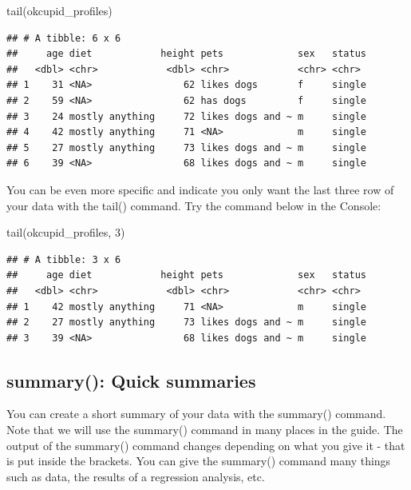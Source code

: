 \documentclass[
]{krantz}
\makeatletter
\newenvironment{Shaded}{\begin{snugshade}}{\end{snugshade}}
\newcommand{\DecValTok}[1]{\textcolor[rgb]{0.06,0.06,0.06}{#1}}
\newcommand{\FunctionTok}[1]{\textcolor[rgb]{0,0,0}{#1}}
\newcommand{\NormalTok}[1]{#1}
\newenvironment{kframe}{%
\medskip{}
\setlength{\fboxsep}{.8em}
 \def\at@end@of@kframe{}%
 \ifinner\ifhmode%
  \def\at@end@of@kframe{\end{minipage}}%
  \begin{minipage}{\columnwidth}%
 \fi\fi%
 \def\FrameCommand##1{\hskip\@totalleftmargin \hskip-\fboxsep
 \colorbox{shadecolor}{##1}\hskip-\fboxsep
     \hskip-\linewidth \hskip-\@totalleftmargin \hskip\columnwidth}%
 \MakeFramed {\advance\hsize-\width
   \@totalleftmargin\z@ \linewidth\hsize
   \@setminipage}}%
 {\par\unskip\endMakeFramed%
 \at@end@of@kframe}
\renewenvironment{Shaded}{\begin{kframe}}{\end{kframe}}
\makeatother
\begin{document}
\begin{Shaded}
\begin{Highlighting}[]
\FunctionTok{tail}\NormalTok{(okcupid\_profiles)}
\end{Highlighting}
\end{Shaded}

\begin{verbatim}
## # A tibble: 6 x 6
##     age diet            height pets             sex   status
##   <dbl> <chr>            <dbl> <chr>            <chr> <chr> 
## 1    31 <NA>                62 likes dogs       f     single
## 2    59 <NA>                62 has dogs         f     single
## 3    24 mostly anything     72 likes dogs and ~ m     single
## 4    42 mostly anything     71 <NA>             m     single
## 5    27 mostly anything     73 likes dogs and ~ m     single
## 6    39 <NA>                68 likes dogs and ~ m     single
\end{verbatim}

You can be even more specific and indicate you only want the last three row of your data with the tail() command. Try the command below in the Console:

\begin{Shaded}
\begin{Highlighting}[]
\FunctionTok{tail}\NormalTok{(okcupid\_profiles, }\DecValTok{3}\NormalTok{)}
\end{Highlighting}
\end{Shaded}

\begin{verbatim}
## # A tibble: 3 x 6
##     age diet            height pets             sex   status
##   <dbl> <chr>            <dbl> <chr>            <chr> <chr> 
## 1    42 mostly anything     71 <NA>             m     single
## 2    27 mostly anything     73 likes dogs and ~ m     single
## 3    39 <NA>                68 likes dogs and ~ m     single
\end{verbatim}

\hypertarget{summary-quick-summaries}{%
\subsection{summary(): Quick summaries}\label{summary-quick-summaries}}

You can create a short summary of your data with the summary() command. Note that we will use the summary() command in many places in the guide. The output of the summary() command changes depending on what you give it - that is put inside the brackets. You can give the summary() command many things such as data, the results of a regression analysis, etc.
\end{document}
